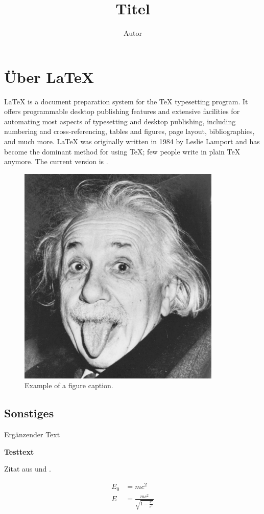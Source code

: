 \documentclass[a4paper, numbers=withenddot, 11pt]{scrartcl}
\title{{{Titel}}}
\author{{{Autor}}}
\begin{document}
\maketitle

\tableofcontents

\section{Über \LaTeX}

\LaTeX{} is a document preparation system for the \TeX{} typesetting program. It offers programmable desktop publishing features and extensive facilities for automating most aspects of typesetting and desktop publishing, including numbering and  cross-referencing, tables and figures, page layout, bibliographies, and much more. \LaTeX{} was originally written in 1984 by Leslie Lamport and has become the  dominant method for using \TeX; few people write in plain \TeX{} anymore. The current version is \LaTeXe.

\begin{figure}[htbp]
\centerline{\includegraphics[width=0.3\linewidth]{einstein}}
\caption{Example of a figure caption.}
\label{fig}
\end{figure}

\subsection{Sonstiges}

{{Ergänzender Text }}

\textbf{{{Testtext}}}

Zitat aus \cite{scheme} und \cite[17]{knuth}.



\begin{align}
E_0 &= mc^2 \\
E &= \frac{mc^2}{\sqrt{1-\frac{v^2}{c^2}}}
\end{align}

\printbibliography
\end{document}
